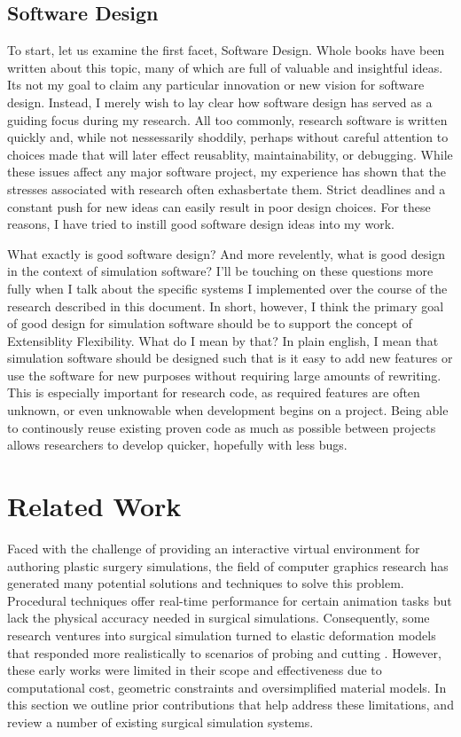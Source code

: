 \documentclass[12pt,oneside,letterpaper]{memoir}
\begin{document}
\section{Software Design}

To start, let us examine the first facet, Software Design. Whole books have
been written about this topic, many of which are full of valuable and
insightful ideas. Its not my goal to claim any particular innovation
or new vision for software design. Instead, I merely wish to lay clear
how software design has served as a guiding focus during my
research. All too commonly, research software is written quickly and,
while not nessessarily shoddily, perhaps without careful attention to
choices made that will later effect reusablity, maintainability, or
debugging. While these issues affect any major software project, my
experience has shown that the stresses associated with research often
exhasbertate them. Strict deadlines and a constant push for new ideas
can easily result in poor design choices. For these reasons, I have
tried to instill good software design ideas into my work.

What exactly is good software design? And more revelently, what is
good design in the context of simulation software? I'll be touching on
these questions more fully when I talk about the specific systems
I implemented over the course of the research described in this
document. In short, however, I think the primary goal of good design
for simulation software should be to support the concept of
Extensiblity Flexibility. What do I mean by that? In plain english, I
mean that simulation software should be designed such that is it easy
to add new features or use the software for new purposes without
requiring large amounts of rewriting. This is especially important for
research code, as required features are often unknown, or even
unknowable when development begins on a project. Being able to
continously reuse existing proven code as much as possible between projects
allows researchers to develop quicker, hopefully with less bugs.


\chapter{Related Work}

Faced with the challenge of providing an interactive virtual
environment for authoring plastic surgery simulations, the field of
computer graphics research has generated many potential solutions and
techniques to solve this problem. Procedural techniques
\cite{JoshiMDGS:2007,WangP:2002,KavanCZO:2008} offer real-time
performance for certain animation tasks but lack the physical accuracy
needed in surgical simulations. Consequently, some research ventures
into surgical simulation turned to elastic deformation models
\cite{TerzoPBF:1987} that responded more realistically to scenarios of
probing and cutting \cite{BroC:1996,MendoL:2003,NienhS:2001}. However,
these early works were limited in their scope and effectiveness due to
computational cost, geometric constraints and oversimplified material
models. In this section we outline prior contributions that help
address these limitations, and review a number of existing surgical
simulation systems.
\end{document}
